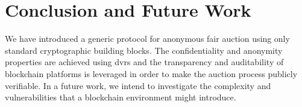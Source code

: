 \section{Conclusion and Future Work}%
\label{sec-conclusion}%

	We have introduced a generic protocol for anonymous fair auction using only standard cryptographic building blocks. The confidentiality and anonymity properties are achieved using \gls{dvrs} and the transparency and auditability of blockchain platforms is leveraged in order to make the auction process publicly verifiable. In a future work, we intend to investigate the complexity and vulnerabilities that a blockchain environment might introduce.
